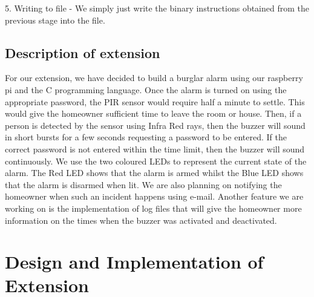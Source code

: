 \documentclass[11pt]{article}
\begin{document}
5. Writing to file - We simply just write the binary instructions obtained from the previous stage into the file.

\subsection{Description of extension}
For our extension, we have decided to build a burglar alarm using our raspberry pi and the C programming language.  Once the alarm is turned on using the appropriate password, the PIR sensor would require half a minute to settle. This would give the homeowner sufficient time to leave the room or house. Then, if a person is detected by the sensor using Infra Red rays, then the buzzer will sound in short bursts for a few seconds requesting a password to be entered. If the correct password is not entered within the time limit, then the buzzer will sound continuously. We use the two coloured LEDs to represent the current state of the alarm. The Red LED shows that the alarm is armed whilst the Blue LED shows that the alarm is disarmed when lit. We are also planning on notifying the homeowner when such an incident happens using e-mail. Another feature we are working on is the implementation of log files that will give the homeowner more information on the times when the buzzer was activated and deactivated.

\section{Design and Implementation of Extension}
\end{document}
